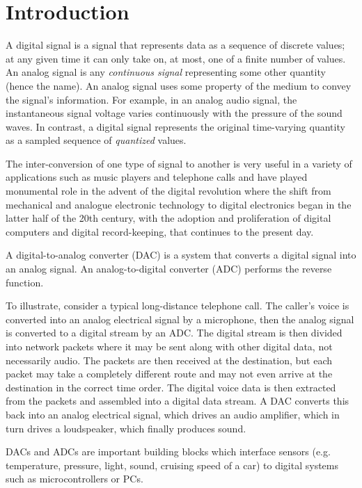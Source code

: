 \documentclass[%
 reprint,
nofootinbib,
 amsmath,amssymb,
 aps,
floatfix,
]{revtex4-2}
\begin{document}
\section{\label{sec:level1}Introduction}
    A digital signal is a signal that represents data as a sequence of discrete values; at any given time it can only take on, at most, one of a finite number of values. An analog signal is any \textit{continuous signal} representing some other quantity (hence the name). An analog signal uses some property of the medium to convey the signal's information. For example, in an analog audio signal, the instantaneous signal voltage varies continuously with the pressure of the sound waves. In contrast, a digital signal represents the original time-varying quantity as a sampled sequence of \textit{quantized} values.
    \par
    The inter-conversion of one type of signal to another is very useful in a variety of applications such as music players and telephone calls and have played monumental role in the advent of the digital revolution where the shift from mechanical and analogue electronic technology to digital electronics began in the latter half of the 20th century, with the adoption and proliferation of digital computers and digital record-keeping, that continues to the present day.
    \par
    A digital-to-analog converter (DAC) is a system that converts a digital signal into an analog signal. An analog-to-digital converter (ADC) performs the reverse function.
    \par
    To illustrate, consider a typical long-distance telephone call. The caller's voice is converted into an analog electrical signal by a microphone, then the analog signal is converted to a digital stream by an ADC. The digital stream is then divided into network packets where it may be sent along with other digital data, not necessarily audio. The packets are then received at the destination, but each packet may take a completely different route and may not even arrive at the destination in the correct time order. The digital voice data is then extracted from the packets and assembled into a digital data stream. A DAC converts this back into an analog electrical signal, which drives an audio amplifier, which in turn drives a loudspeaker, which finally produces sound.
    \par
    DACs and ADCs are important building blocks which interface sensors (e.g. temperature, pressure, light, sound, cruising speed of a car) to digital systems such as microcontrollers or PCs.
    
\end{document}
